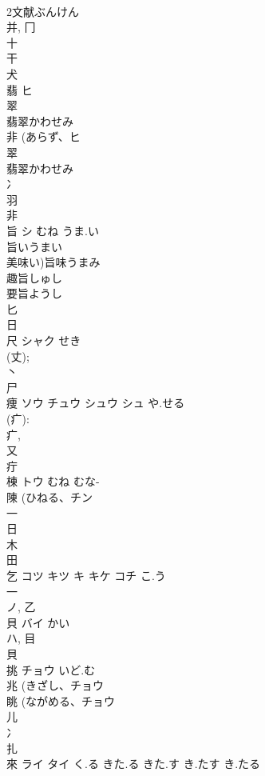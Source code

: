 \documentclass[8pt]{extreport}
\begin{document}
\begin{CJK}{UTF8}{min}
\\	2文献ぶんけん
\\	并, 冂 
\\	十 
\\	干 
\\	犬 
\\	翡	ヒ		
\\	翠 
\\	翡翠かわせみ 
\\	非 (あらず、ヒ 
\\	翠 
\\	翡翠かわせみ
\\	冫 
\\	羽 
\\	非 
\\	旨	シ	むね うま.い	
\\	旨いうまい
\\	美味い)旨味うまみ
\\	趣旨しゅし
\\	要旨ようし
\\	匕 
\\	日 
\\	尺	シャク	せき	
\\	(丈); 
\\	丶 
\\	尸 
\\	痩	ソウ チュウ シュウ シュ	や.せる	
\\	(疒): 
\\	疒, 
\\	又 
\\	疔 
\\	棟	トウ	むね むな-	
\\	陳 (ひねる、チン 
\\	一 
\\	日 
\\	木 
\\	田 
\\	乞	コツ キツ キ キケ コチ	こ.う	
\\	一 
\\	ノ, 乙 
\\	貝	バイ	かい	
\\	ハ, 目 
\\	貝 
\\	挑	チョウ	いど.む	
\\	兆 (きざし、チョウ 
\\	眺 (ながめる、チョウ 
\\	儿 
\\	冫 
\\	扎	
\\	來	ライ タイ	く.る きた.る きた.す き.たす き.たる	

\end{CJK}
\end{document}

